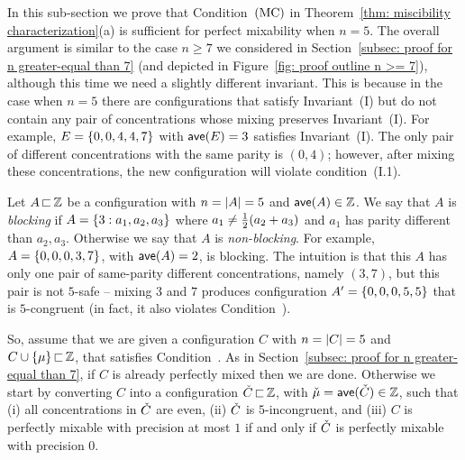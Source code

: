 


In this sub-section we prove that Condition~${\textrm{(MC)}}$ in 
Theorem~\ref{thm: miscibility characterization}(a) is sufficient 
for perfect mixability when $n=5$.
The overall argument is similar to the case $n \geq 7$ we considered in 
Section~\ref{subsec: proof for n greater-equal than 7}
(and depicted in Figure~\ref{fig: proof outline n >= 7}),
although this time we need a slightly different invariant. 
This is because in the case when $n=5$ there are configurations that
satisfy Invariant~(I) but do not contain any pair of concentrations
whose mixing preserves Invariant~(I).
For example, $E = { \left\{ 0,0,4,4,7 \right\} }$ with ${\textsf{ave}}(E)=3$
satisfies Invariant~(I). The only pair of different concentrations with
the same parity is $(0,4)$; however, after mixing these concentrations,
the new configuration will violate condition~(I.1).

Let $A{\,\sqsubset\,}{\mathbb Z}$ be a configuration with $n = {|A|} = 5$ and
 ${\textsf{ave}}(A)\in{\mathbb Z}$.
We say that $A$ is \emph{blocking} if $A={ \left\{ 3:a_1,a_2,a_3 \right\} }$
where $a_1\neq{\textstyle\frac{1}{2}}(a_2+a_3)$ and $a_1$ has parity different than $a_2,a_3$.
Otherwise we say that $A$ is \emph{non-blocking}.
For example, $A = { \left\{ 0,0,0,3,7 \right\} }$, with ${\textsf{ave}}(A)= 2$, is blocking.
The intuition is that this $A$ has only one pair of same-parity different
concentrations, namely $(3,7)$, but this pair is not $5$-safe --
mixing $3$ and $7$ produces configuration
$A' = { \left\{ 0,0,0,5,5 \right\} }$ that is $5$-congruent (in fact, it also violates Condition~{\MixCond}).

So, assume that we are given a configuration $C$ with $n = {|C|} = 5$ and
$C \cup { \left\{ \mu \right\} } {\,\sqsubset\,} {\mathbb Z}$, that
satisfies Condition~{\MixCond}. 
As in Section~\ref{subsec: proof for n greater-equal than 7},
if $C$ is already perfectly mixed then we are done.
Otherwise we start by converting $C$ into a configuration
 ${\check{C}}{\,\sqsubset\,}{\mathbb Z}$, with ${\check{\mu}} = {\textsf{ave}}({\check{C}})\in{\mathbb Z}$,
such that (i) all concentrations in ${\check{C}}$ are even,
(ii) ${\check{C}}$ is $5$-incongruent, and
(iii) $C$ is perfectly mixable with precision at most $1$ if and only if ${\check{C}}$
is perfectly mixable with precision $0$.

